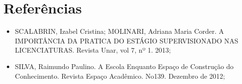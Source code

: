 \documentclass[a4paper,10pt]{article}
\begin{document}
  \section{Referências}
  
    \begin{itemize}
      \item SCALABRIN, Izabel Cristina; MOLINARI, Adriana Maria Corder. A IMPORTÂNCIA DA PRATICA DO ESTÁGIO SUPERVISIONADO NAS 
      LICENCIATURAS. Revista Unar, vol 7, nº 1. 2013;

      \item SILVA, Raimundo Paulino. A Escola Enquanto Espaço de Construção do Conhecimento. Revista Espaço Acadêmico. No139. 
      Dezembro de 2012;
    \end{itemize}
\end{document}

